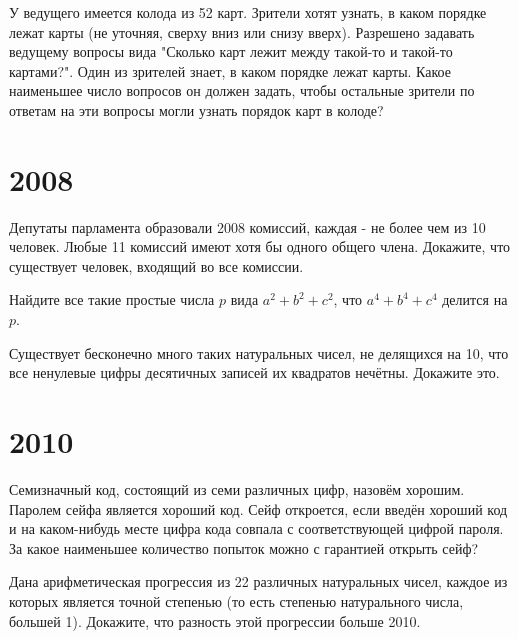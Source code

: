 \documentclass[11pt, a4paper]{common/document_template}
\begin{document}
\begin{exercise}[2033]
У ведущего имеется колода из 52 карт. Зрители хотят узнать, в каком порядке лежат карты (не уточняя, сверху вниз или снизу вверх). Разрешено задавать ведущему вопросы вида "Сколько карт лежит между такой-то и такой-то картами?". Один из зрителей знает, в каком порядке лежат карты. Какое наименьшее число вопросов он должен задать, чтобы остальные зрители по ответам на эти вопросы могли узнать порядок карт в колоде?
\end{exercise}

\chapter{2008}

\begin{exercise}[2096]
Депутаты парламента образовали 2008 комиссий, каждая - не более чем из 10 человек. Любые 11 комиссий имеют хотя бы одного общего члена. Докажите, что существует человек, входящий во все комиссии.
\end{exercise}

\begin{exercise}[2097]
Найдите все такие простые числа $p$ вида $a^{2} + b^{2} + c^{2}$, что $a^{4} + b^{4} + c^{4}$ делится на $p$.
\end{exercise}

\begin{exercise}[2114]
Существует бесконечно много таких натуральных чисел, не делящихся на 10, что все ненулевые цифры десятичных записей их квадратов нечётны. Докажите это.
\end{exercise}


\chapter{2010}

\begin{exercise}[2162]
Семизначный код, состоящий из семи различных цифр, назовём хорошим. Паролем сейфа является хороший код. Сейф откроется, если введён хороший код и на каком-нибудь месте цифра кода совпала с соответствующей цифрой пароля. За какое наименьшее количество попыток можно с гарантией открыть сейф?
\end{exercise}

\begin{exercise}[2202]
Дана арифметическая прогрессия из 22 различных натуральных чисел, каждое из которых является точной степенью (то есть степенью натурального числа, большей 1). Докажите, что разность этой прогрессии больше 2010.
\end{exercise}
\end{document}
